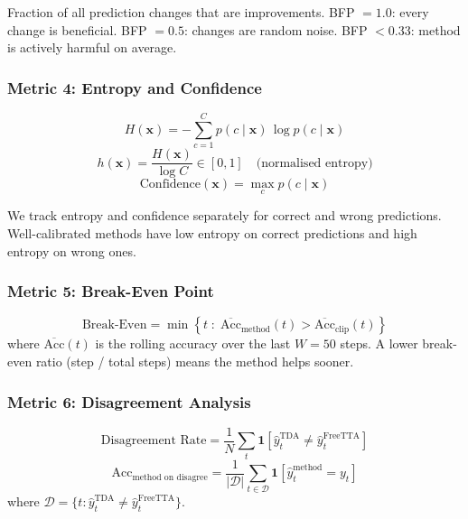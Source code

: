 \documentclass[12pt,a4paper]{article}
\newcommand{\bx}{\mathbf{x}}
\newcommand{\1}{\mathbf{1}}
\begin{document}
Fraction of all prediction changes that are improvements.
BFP $= 1.0$: every change is beneficial.
BFP $= 0.5$: changes are random noise.
BFP $< 0.33$: method is actively harmful on average.

\subsubsection{Metric 4: Entropy and Confidence}
\begin{equation}
  H(\bx) = -\sum_{c=1}^C p(c \mid \bx)\,\log p(c \mid \bx)
  \label{eq:entropy}
\end{equation}
\begin{equation}
  h(\bx) = \frac{H(\bx)}{\log C} \in [0, 1] \quad\text{(normalised entropy)}
\end{equation}
\begin{equation}
  \text{Confidence}(\bx) = \max_c p(c \mid \bx)
\end{equation}

We track entropy and confidence separately for correct and wrong predictions.
Well-calibrated methods have low entropy on correct predictions and high entropy on wrong ones.

\subsubsection{Metric 5: Break-Even Point}
\begin{equation}
  \text{Break-Even} = \min\left\{t \;:\; \overline{\text{Acc}}_{\text{method}}(t) > \overline{\text{Acc}}_{\text{clip}}(t)\right\}
\end{equation}
where $\overline{\text{Acc}}(t)$ is the rolling accuracy over the last $W=50$ steps.
A lower break-even ratio (step / total steps) means the method helps sooner.

\subsubsection{Metric 6: Disagreement Analysis}
\begin{equation}
  \text{Disagreement Rate} = \frac{1}{N}\sum_t \mathbf{1}\!\left[\hat{y}_t^{\text{TDA}} \neq \hat{y}_t^{\text{FreeTTA}}\right]
\end{equation}
\begin{equation}
  \text{Acc}_{\text{method on disagree}} = \frac{1}{|\mathcal{D}|}\sum_{t \in \mathcal{D}} \mathbf{1}\!\left[\hat{y}_t^{\text{method}} = y_t\right]
\end{equation}
where $\mathcal{D} = \{t : \hat{y}_t^{\text{TDA}} \neq \hat{y}_t^{\text{FreeTTA}}\}$.
\end{document}
